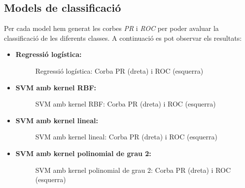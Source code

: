 \documentclass[a4paper, 11pt]{article}
\begin{document}
    \subsection{Models de classificació}
    Per cada model hem generat les corbes \textit{PR} i \textit{ROC} per poder avaluar la classificació de les
    diferents classes. A continuació es pot observar els resultats:
    \newpage
        \begin{itemize}
            \item \textbf{Regressió logística:}


                \begin{figure}[H]%
                \centering
                \qquad
                \caption*{Regressió logística: Corba PR (dreta) i ROC (esquerra)}
                \end{figure}

            \item \textbf{SVM amb kernel RBF:}


                \begin{figure}[H]%
                \centering
                \qquad
                \caption*{SVM amb kernel RBF: Corba PR (dreta) i ROC (esquerra)}
                \end{figure}

            \item \textbf{SVM amb kernel lineal:}


                \begin{figure}[H]%
                \centering
                \qquad
                \caption*{SVM amb kernel lineal: Corba PR (dreta) i ROC (esquerra)}
                \end{figure}


            \item \textbf{SVM amb kernel polinomial de grau 2:}


                \begin{figure}[H]%
                \centering
                \qquad
                \caption*{SVM amb kernel polinomial de grau 2: Corba PR (dreta) i ROC (esquerra)}
                \end{figure}



\end{itemize}
\end{document}
